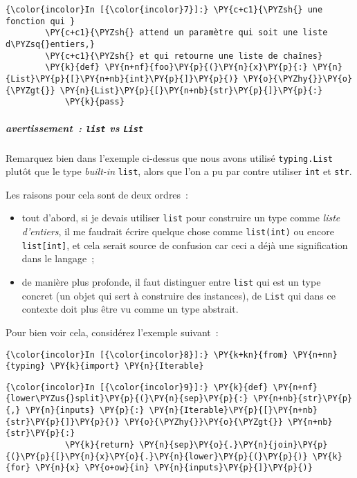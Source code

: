     \begin{Verbatim}[commandchars=\\\{\}]
{\color{incolor}In [{\color{incolor}7}]:} \PY{c+c1}{\PYZsh{} une fonction qui }
        \PY{c+c1}{\PYZsh{} attend un paramètre qui soit une liste d\PYZsq{}entiers,}
        \PY{c+c1}{\PYZsh{} et qui retourne une liste de chaînes}
        \PY{k}{def} \PY{n+nf}{foo}\PY{p}{(}\PY{n}{x}\PY{p}{:} \PY{n}{List}\PY{p}{[}\PY{n+nb}{int}\PY{p}{]}\PY{p}{)} \PY{o}{\PYZhy{}}\PY{o}{\PYZgt{}} \PY{n}{List}\PY{p}{[}\PY{n+nb}{str}\PY{p}{]}\PY{p}{:}
            \PY{k}{pass}    
\end{Verbatim}


    \hypertarget{avertissement-list-vs-list}{%
\subparagraph{\texorpdfstring{avertissement~: \texttt{list} vs
\texttt{List}}{avertissement~: list vs List}}\label{avertissement-list-vs-list}}

    Remarquez bien dans l'exemple ci-dessus que nous avons utilisé
\texttt{typing.List} plutôt que le type \emph{built-in} \texttt{list},
alors que l'on a pu par contre utiliser \texttt{int} et \texttt{str}.

Les raisons pour cela sont de deux ordres~:

\begin{itemize}
\item
  tout d'abord, si je devais utiliser \texttt{list} pour construire un
  type comme \emph{liste d'entiers}, il me faudrait écrire quelque chose
  comme \texttt{list(int)} ou encore \texttt{list{[}int{]}}, et cela
  serait source de confusion car ceci a déjà une signification dans le
  langage~;
\item
  de manière plus profonde, il faut distinguer entre \texttt{list} qui
  est un type concret (un objet qui sert à construire des instances), de
  \texttt{List} qui dans ce contexte doit plus être vu comme un type
  abstrait.
\end{itemize}

    Pour bien voir cela, considérez l'exemple suivant~:

    \begin{Verbatim}[commandchars=\\\{\}]
{\color{incolor}In [{\color{incolor}8}]:} \PY{k+kn}{from} \PY{n+nn}{typing} \PY{k}{import} \PY{n}{Iterable}
\end{Verbatim}


    \begin{Verbatim}[commandchars=\\\{\}]
{\color{incolor}In [{\color{incolor}9}]:} \PY{k}{def} \PY{n+nf}{lower\PYZus{}split}\PY{p}{(}\PY{n}{sep}\PY{p}{:} \PY{n+nb}{str}\PY{p}{,} \PY{n}{inputs} \PY{p}{:} \PY{n}{Iterable}\PY{p}{[}\PY{n+nb}{str}\PY{p}{]}\PY{p}{)} \PY{o}{\PYZhy{}}\PY{o}{\PYZgt{}} \PY{n+nb}{str}\PY{p}{:}
            \PY{k}{return} \PY{n}{sep}\PY{o}{.}\PY{n}{join}\PY{p}{(}\PY{p}{[}\PY{n}{x}\PY{o}{.}\PY{n}{lower}\PY{p}{(}\PY{p}{)} \PY{k}{for} \PY{n}{x} \PY{o+ow}{in} \PY{n}{inputs}\PY{p}{]}\PY{p}{)}
\end{Verbatim}



